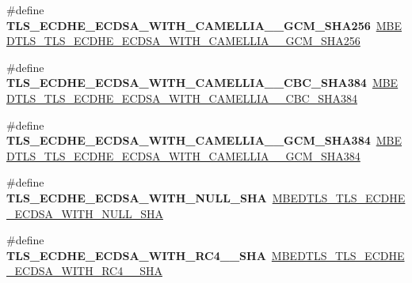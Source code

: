 \begin{DoxyCompactItemize}
\item 
\mbox{\label{compat-1_83_8h_a67cc77b084d7ab2fc9e5fe1de2426eea}} 
\#define {\bfseries T\+L\+S\+\_\+\+E\+C\+D\+H\+E\+\_\+\+E\+C\+D\+S\+A\+\_\+\+W\+I\+T\+H\+\_\+\+C\+A\+M\+E\+L\+L\+I\+A\+\_\+\_\+\+G\+C\+M\+\_\+\+S\+H\+A256}~\mbox{\hyperlink{ssl__ciphersuites_8h_a8b4884d7e7c4583adeeee578d6ea3551}{M\+B\+E\+D\+T\+L\+S\+\_\+\+T\+L\+S\+\_\+\+E\+C\+D\+H\+E\+\_\+\+E\+C\+D\+S\+A\+\_\+\+W\+I\+T\+H\+\_\+\+C\+A\+M\+E\+L\+L\+I\+A\+\_\+\_\+\+G\+C\+M\+\_\+\+S\+H\+A256}}
\item 
\mbox{\label{compat-1_83_8h_a4a62fb5e5c927e04100541156cbcc8a4}} 
\#define {\bfseries T\+L\+S\+\_\+\+E\+C\+D\+H\+E\+\_\+\+E\+C\+D\+S\+A\+\_\+\+W\+I\+T\+H\+\_\+\+C\+A\+M\+E\+L\+L\+I\+A\+\_\+\_\+\+C\+B\+C\+\_\+\+S\+H\+A384}~\mbox{\hyperlink{ssl__ciphersuites_8h_af9f6960455884d1403eebc12c12a5723}{M\+B\+E\+D\+T\+L\+S\+\_\+\+T\+L\+S\+\_\+\+E\+C\+D\+H\+E\+\_\+\+E\+C\+D\+S\+A\+\_\+\+W\+I\+T\+H\+\_\+\+C\+A\+M\+E\+L\+L\+I\+A\+\_\+\_\+\+C\+B\+C\+\_\+\+S\+H\+A384}}
\item 
\mbox{\label{compat-1_83_8h_a3b62aaa22dac436ed4900ae8a4b951e3}} 
\#define {\bfseries T\+L\+S\+\_\+\+E\+C\+D\+H\+E\+\_\+\+E\+C\+D\+S\+A\+\_\+\+W\+I\+T\+H\+\_\+\+C\+A\+M\+E\+L\+L\+I\+A\+\_\+\_\+\+G\+C\+M\+\_\+\+S\+H\+A384}~\mbox{\hyperlink{ssl__ciphersuites_8h_af4a21bbea6146cc416ad7eb3a9a98b98}{M\+B\+E\+D\+T\+L\+S\+\_\+\+T\+L\+S\+\_\+\+E\+C\+D\+H\+E\+\_\+\+E\+C\+D\+S\+A\+\_\+\+W\+I\+T\+H\+\_\+\+C\+A\+M\+E\+L\+L\+I\+A\+\_\+\_\+\+G\+C\+M\+\_\+\+S\+H\+A384}}
\item 
\mbox{\label{compat-1_83_8h_a91a8463281be48d23d8228562fb1cd83}} 
\#define {\bfseries T\+L\+S\+\_\+\+E\+C\+D\+H\+E\+\_\+\+E\+C\+D\+S\+A\+\_\+\+W\+I\+T\+H\+\_\+\+N\+U\+L\+L\+\_\+\+S\+HA}~\mbox{\hyperlink{ssl__ciphersuites_8h_a74a8cea63eb3259bbd89750742d43d10}{M\+B\+E\+D\+T\+L\+S\+\_\+\+T\+L\+S\+\_\+\+E\+C\+D\+H\+E\+\_\+\+E\+C\+D\+S\+A\+\_\+\+W\+I\+T\+H\+\_\+\+N\+U\+L\+L\+\_\+\+S\+HA}}
\item 
\mbox{\label{compat-1_83_8h_afad7747f5ea2c8b5f8cad720e58245c1}} 
\#define {\bfseries T\+L\+S\+\_\+\+E\+C\+D\+H\+E\+\_\+\+E\+C\+D\+S\+A\+\_\+\+W\+I\+T\+H\+\_\+\+R\+C4\+\_\+\_\+\+S\+HA}~\mbox{\hyperlink{ssl__ciphersuites_8h_af4f043bc84867aee990ec507af89bb32}{M\+B\+E\+D\+T\+L\+S\+\_\+\+T\+L\+S\+\_\+\+E\+C\+D\+H\+E\+\_\+\+E\+C\+D\+S\+A\+\_\+\+W\+I\+T\+H\+\_\+\+R\+C4\+\_\+\_\+\+S\+HA}}

\end{DoxyCompactItemize}
